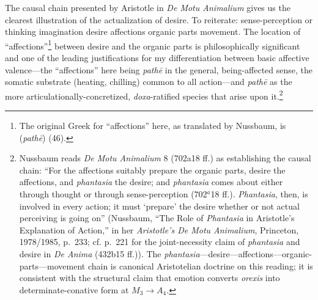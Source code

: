 The causal chain presented by Aristotle in \textit{De Motu Animalium} gives us the clearest illustration of the actualization of desire. To reiterate: sense-perception or thinking \ra imagination \ra desire \ra affections \ra organic parts \ra movement. The location of ``affections''\footnote{The original Greek for ``affections'' here, as translated by Nussbaum, is  (\textit{pathē}) (46).} between desire and the organic parts is philosophically significant and one of the leading justifications for my differentiation between basic affective valence---the ``affections'' here being \textit{pathē} in the general, being-affected sense, the somatic substrate (heating, chilling) common to all action---and \textit{pathē} as the more articulationally-concretized, \textit{doxa}-ratified species that arise upon it.\footnote{Nussbaum reads \textit{De Motu Animalium} 8 (702a18 ff.) as establishing the causal chain: ``For the affections suitably prepare the organic parts, desire the affections, and \textit{phantasia} the desire; and \textit{phantasia} comes about either through thought or through sense-perception (702$^{a}$18 ff.). \textit{Phantasia}, then, is involved in every action; it must `prepare' the desire whether or not actual perceiving is going on'' (Nussbaum, ``The Role of \textit{Phantasia} in Aristotle's Explanation of Action,'' in her \textit{Aristotle's De Motu Animalium}, Princeton, 1978/1985, p.~233; cf. p.~221 for the joint-necessity claim of \textit{phantasia} and desire in \textit{De Anima} (432b15 ff.)). The \textit{phantasia}---desire---affections---organic-parts---movement chain is canonical Aristotelian doctrine on this reading; it is consistent with the structural claim that emotion converts \textit{orexis} into determinate-conative form at $M_3 \rightarrow A_4$.}


